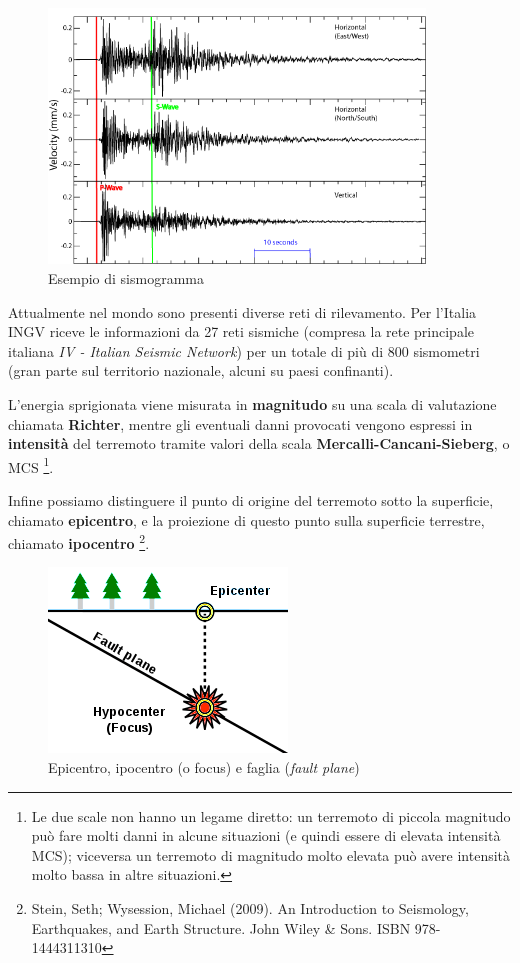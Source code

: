 \documentclass[a4paper,10pt]{memoir}
\begin{document}
\begin{figure}[ht]
\caption{Esempio di sismogramma}
\label{fig:sismogramma}
\centering
\includegraphics[width=10cm]{introduzione/seismogram}
\end{figure}

Attualmente nel mondo sono presenti diverse reti di rilevamento. Per l'Italia INGV riceve le informazioni da 27 reti sismiche (compresa la rete principale italiana \textit{IV - Italian Seismic Network}) per un totale di più di 800 sismometri (gran parte sul territorio nazionale, alcuni su paesi confinanti).

L'energia sprigionata viene misurata in \textbf{magnitudo} su una scala di valutazione chiamata \textbf{Richter}, mentre gli eventuali danni provocati vengono espressi in \textbf{intensità} del terremoto tramite valori della scala \textbf{Mercalli-Cancani-Sieberg}, o MCS \footnote{Le due scale non hanno un legame diretto: un terremoto di piccola magnitudo può fare molti danni in alcune situazioni (e quindi essere di elevata intensità MCS); viceversa un terremoto di magnitudo molto elevata può avere intensità molto bassa in altre situazioni.}.

Infine possiamo distinguere il punto di origine del terremoto sotto la superficie, chiamato \textbf{epicentro}, e la proiezione di questo punto sulla superficie terrestre, chiamato \textbf{ipocentro} \footnote{Stein, Seth; Wysession, Michael (2009). An Introduction to Seismology, Earthquakes, and Earth Structure. John Wiley \& Sons. ISBN 978-1444311310}.

\begin{figure}[ht]
\caption{Epicentro, ipocentro (o focus) e faglia (\textit{fault plane})}
\label{fig:epiipo}
\centering
\includegraphics[scale=0.6]{introduzione/epicenter_diagram}
\end{figure}
\end{document}
